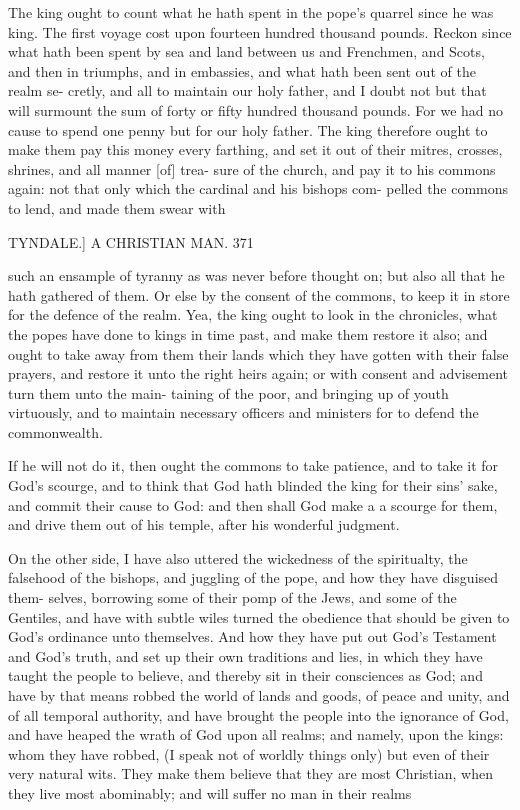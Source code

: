\documentclass{custom}
\begin{document}
{The king ought to count what he hath spent in the 
pope's quarrel since he was king. The first voyage 
cost upon fourteen hundred thousand pounds. Reckon 
since what hath been spent by sea and land between us 
and Frenchmen, and Scots, and then in triumphs, and in 
embassies, and what hath been sent out of the realm se- 
cretly, and all to maintain our holy father, and I doubt 
not but that will surmount the sum of forty or fifty hundred 
thousand pounds. For we had no cause to spend one 
penny but for our holy father. The king therefore ought 
to make them pay this money every farthing, and set it out 
of their mitres, crosses, shrines, and all manner [of] trea- 
sure of the church, and pay it to his commons again: 
not that only which the cardinal and his bishops com- 
pelled the commons to lend, and made them swear with 


TYNDALE.] A CHRISTIAN MAN. 371

such an ensample of tyranny as was never before thought 
on; but also all that he hath gathered of them. Or else 
by the consent of the commons, to keep it in store for the 
defence of the realm. Yea, the king ought to look in 
the chronicles, what the popes have done to kings in time 
past, and make them restore it also; and ought to take 
away from them their lands which they have gotten with 
their false prayers, and restore it unto the right heirs again; 
or with consent and advisement turn them unto the main- 
taining of the poor, and bringing up of youth virtuously, 
and to maintain necessary officers and ministers for to 
defend the commonwealth. 

If he will not do it, then ought the commons to take 
patience, and to take it for God's scourge, and to think 
that God hath blinded the king for their sins' sake, and 
commit their cause to God: and then shall God make a 
a scourge for them, and drive them out of his temple, 
after his wonderful judgment. 

On the other side, I have also uttered the wickedness 
of the spiritualty, the falsehood of the bishops, and 
juggling of the pope, and how they have disguised them- 
selves, borrowing some of their pomp of the Jews, and 
some of the Gentiles, and have with subtle wiles turned 
the obedience that should be given to God's ordinance unto 
themselves. And how they have put out God's Testament 
and God's truth, and set up their own traditions and lies, 
in which they have taught the people to believe, and thereby 
sit in their consciences as God; and have by that means 
robbed the world of lands and goods, of peace and unity, 
and of all temporal authority, and have brought the people 
into the ignorance of God, and have heaped the wrath of 
God upon all realms; and namely, upon the kings: 
whom they have robbed, (I speak not of worldly things 
only) but even of their very natural wits. They make 
them believe that they are most Christian, when they live 
most abominably; and will suffer no man in their realms 

}
\end{document}
